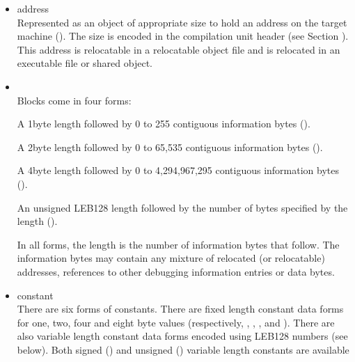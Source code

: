 \begin{itemize}
\item address \\
Represented as an object of appropriate size to hold an
address on the target machine 
(). The size is
encoded in the compilation unit header 
(see Section ).
This address is relocatable in a relocatable object file and
is relocated in an executable file or shared object.

\item {} \\
Blocks come in four forms:

\begin{myindentpara}{1cm}
A 1\dash byte length followed by 0 to 255 contiguous information
bytes ().
\end{myindentpara}

\begin{myindentpara}{1cm}
A 2\dash byte length followed by 0 to 65,535 contiguous information
bytes ().
\end{myindentpara}


\begin{myindentpara}{1cm}
A 4\dash byte length followed by 0 to 4,294,967,295 contiguous
information bytes ().
\end{myindentpara}


\begin{myindentpara}{1cm}
An unsigned LEB128 length followed by the number of bytes
specified by the length ().
\end{myindentpara}

In all forms, the length is the number of information bytes
that follow. The information bytes may contain any mixture
of relocated (or relocatable) addresses, references to other
debugging information entries or data bytes.

\item constant \\
There are six forms of constants. There are fixed length
constant data forms for one, two, four and eight byte values
(respectively, 
, 
, 
,
and ). 
There are also variable length constant
data forms encoded using LEB128 numbers (see below). Both
signed () and unsigned 
() variable
length constants are available


\end{itemize}
